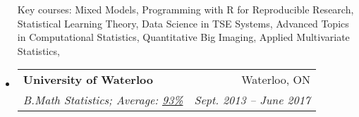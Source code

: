 \documentclass[letterpaper,11pt]{article}
\makeatletter
\newcommand{\resitem}[4]{\begin{tabular*}{17.5cm}{l@{\extracolsep{\fill}}r} \textbf{#1} & #2 \\ \textit{#3} & \textit{#4} \\ \end{tabular*} \vspace{-6pt}}
\makeatother
\begin{document}
\begin{itemize}
{	%
	\footnotesize Key courses: Mixed Models, 
	Programming with R for Reproducible Research, 
	Statistical Learning Theory, 
	Data Science in TSE Systems,
	Advanced Topics in Computational Statistics, 
	Quantitative Big Imaging, 
	Applied Multivariate Statistics,
	\par} \vspace{-4pt}
\item 
	\resitem{University of Waterloo %
	}{Waterloo, ON}{B.Math Statistics;
	Average: \href{https://uwaterloo.ca/registrar/transcripts/transcript-legend}{93\%}}{Sept. 2013 -- June 2017} \vspace{2pt}
	

\end{itemize}
\end{document}
